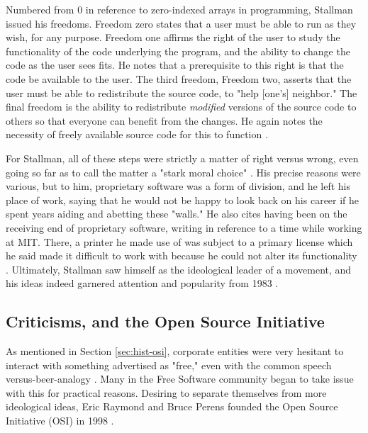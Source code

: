 \documentclass[manuscript,screen,nonacm,12pt]{acmart}
\begin{document}
Numbered from 0 in reference to zero-indexed arrays in programming,
Stallman issued his freedoms. Freedom zero states that a user must be able to
run as they wish, for any purpose. Freedom one affirms the right of the user to
study the functionality of the code underlying the program, and the ability to
change the code as the user sees fits. He notes that a prerequisite to this
right is that the code be available to the user. The third freedom, Freedom two,
asserts that the user must be able to redistribute the source code, to "help
[one's] neighbor." The final freedom is the ability to redistribute
\textit{modified} versions of the source code to others so that everyone can
benefit from the changes. He again notes the necessity of freely available
source code for this to function \cite{stallman_free2002}.

For Stallman, all of these steps were strictly a matter of right versus wrong,
even going so far as to call the matter a "stark moral choice"
\cite{stallman_free2002}. His precise reasons were various, but to him,
proprietary software was a form of division, and he left his place of work,
saying that he would not be happy to look back on his career if he spent years
aiding and abetting these "walls." He also cites having been on the receiving
end of proprietary software, writing in reference to a time while working at
MIT. There, a printer he made use of was subject to a primary license which he
said made it difficult to work with because he could not alter its functionality
\cite{stallman_free2002}. Ultimately, Stallman saw himself as the ideological
leader of a movement, and his ideas indeed garnered attention and popularity
from 1983 \cite{klang_2005}.

\subsection{Criticisms, and the Open Source Initiative}
As mentioned in Section \ref{sec:hist-osi}, corporate entities were very
hesitant to interact with something advertised as "free," even with the common
speech versus-beer-analogy \cite{klang_2005}. Many in the Free Software
community began to take issue with this for practical reasons. Desiring to
separate themselves from more ideological ideas, Eric Raymond and Bruce Perens
founded the Open Source Initiative (OSI) in 1998 \cite{OSI2025}.
\end{document}
